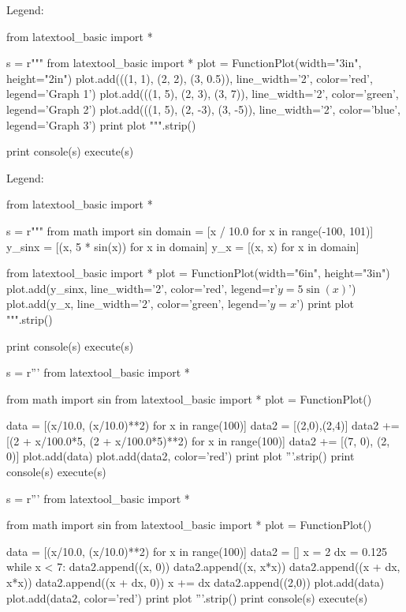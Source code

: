 \newpage
Legend:
\begin{python}
from latextool_basic import *

s = r"""
from latextool_basic import *
plot = FunctionPlot(width="3in", height="2in")
plot.add(((1, 1), (2, 2), (3, 0.5)), line_width='2', color='red', legend='Graph 1')
plot.add(((1, 5), (2, 3), (3, 7)), line_width='2', color='green', legend='Graph 2')
plot.add(((1, 5), (2, -3), (3, -5)), line_width='2', color='blue', legend='Graph 3')
print plot
""".strip()

print console(s)
execute(s)
\end{python}



\newpage
Legend:
\begin{python}
from latextool_basic import *

s = r"""
from math import sin
domain = [x / 10.0 for x in range(-100, 101)]
y_sinx = [(x, 5 * sin(x)) for x in domain]
y_x = [(x, x) for x in domain]

from latextool_basic import *
plot = FunctionPlot(width="6in", height="3in")
plot.add(y_sinx, line_width='2', color='red', legend=r'$y = 5 \sin(x)$')
plot.add(y_x, line_width='2', color='green', legend='$y = x$')
print plot
""".strip()

print console(s)
execute(s)
\end{python}





\newpage
\begin{python}
s = r'''
from latextool_basic import *

from math import sin
from latextool_basic import *
plot = FunctionPlot()

data = [(x/10.0, (x/10.0)**2) for x in range(100)]
data2 = [(2,0),(2,4)]
data2 += [(2 + x/100.0*5, (2 + x/100.0*5)**2) for x in range(100)]
data2 += [(7, 0), (2, 0)]
plot.add(data)
plot.add(data2, color='red')
print plot
'''.strip()
print console(s)
execute(s)
\end{python}


\newpage
\begin{python}
s = r'''
from latextool_basic import *

from math import sin
from latextool_basic import *
plot = FunctionPlot()

data = [(x/10.0, (x/10.0)**2) for x in range(100)]
data2 = []
x = 2
dx = 0.125
while x < 7:
    data2.append((x, 0))
    data2.append((x, x*x))
    data2.append((x + dx, x*x))
    data2.append((x + dx, 0))
    x += dx
data2.append((2,0))
plot.add(data)
plot.add(data2, color='red')
print plot
'''.strip()
print console(s)
execute(s)
\end{python}


